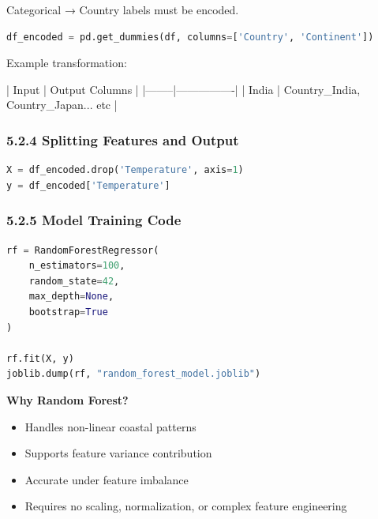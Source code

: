 \documentclass[12pt, a4paper]{article}
\begin{document}
Categorical → Country labels must be encoded.

\begin{lstlisting}[language=Python]
df_encoded = pd.get_dummies(df, columns=['Country', 'Continent'])
\end{lstlisting}

Example transformation:

| Input | Output Columns |
|--------|----------------|
| India  | Country\_India, Country\_Japan... etc |



\subsubsection{\textbf{5.2.4 Splitting Features and Output}}

\begin{lstlisting}[language=Python]
X = df_encoded.drop('Temperature', axis=1)
y = df_encoded['Temperature']
\end{lstlisting}



\subsubsection{\textbf{5.2.5 Model Training Code}}

\begin{lstlisting}[language=Python]
rf = RandomForestRegressor(
    n_estimators=100,
    random_state=42,
    max_depth=None,
    bootstrap=True
)

rf.fit(X, y)
joblib.dump(rf, "random_forest_model.joblib")
\end{lstlisting}

\textbf{Why Random Forest?}

\begin{itemize}
    \item Handles non-linear coastal patterns
    \item Supports feature variance contribution
    \item Accurate under feature imbalance
    \item Requires no scaling, normalization, or complex feature engineering
\end{itemize}
\end{document}
